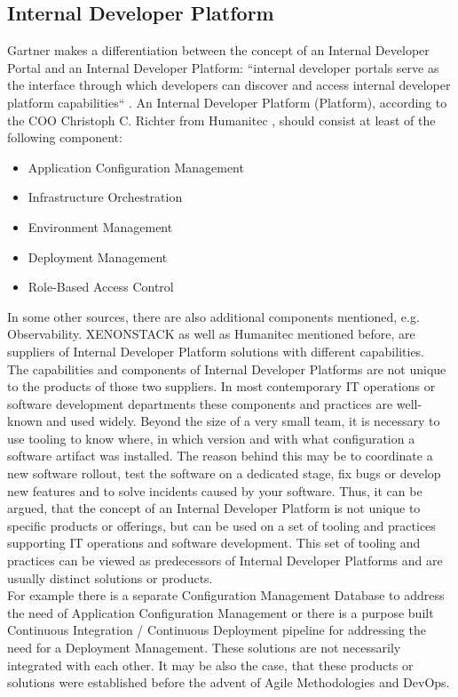 \documentclass[a4paper,12pt]{article}
\begin{document}
    \subsection{Internal Developer Platform}
    \label{subsec:vpplatform}
    Gartner makes a differentiation between the concept of an Internal Developer Portal and an Internal Developer Platform:
    ``internal developer portals serve as the interface through which developers can discover and
    access internal developer platform capabilities``\parencite{gartner} .
    An Internal Developer Platform (Platform), according to the COO Christoph C. Richter from Humanitec\parencite{richteretal} ,
    should consist at least of the following component:
    \begin{itemize}
        \item Application Configuration Management
        \item Infrastructure Orchestration
        \item Environment Management
        \item Deployment Management
        \item Role-Based Access Control
    \end{itemize}
    In some other sources, there are also additional components mentioned, e.g. Observability\parencite{xenon}.
    XENONSTACK as well as Humanitec mentioned before, are suppliers of Internal Developer Platform solutions with
    different capabilities.\\
    The capabilities and components of Internal Developer Platforms are not unique to the products of those two suppliers.
    In most contemporary IT operations or software development departments these components and practices are well-known
    and used widely.
    Beyond the size of a very small team, it is necessary to use tooling to know where, in which version and with what
    configuration a software artifact was installed.
    The reason behind this may be to coordinate a new software rollout, test the software on a dedicated stage, fix bugs
    or develop new features and to solve incidents caused by your software.
    Thus, it can be argued, that the concept of an Internal Developer Platform is not unique to specific products
    or offerings, but can be used on a set of tooling and practices supporting IT operations and software development.
    This set of tooling and practices can be viewed as predecessors of Internal Developer Platforms and are usually
    distinct solutions or products.\\
    For example there is a separate Configuration Management Database
    to address the need of Application Configuration Management or there is a purpose built Continuous Integration /
    Continuous Deployment pipeline for addressing the need for a Deployment Management.
    These solutions are not necessarily integrated with each other.
    It may be also the case, that these
    products or solutions were established before the advent of Agile Methodologies and DevOps.
\end{document}
